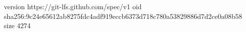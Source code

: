 version https://git-lfs.github.com/spec/v1
oid sha256:9c24e65612ab8275fdc4adf919eccb6373d718c780a53829886d7d2ce0a08b58
size 4274
